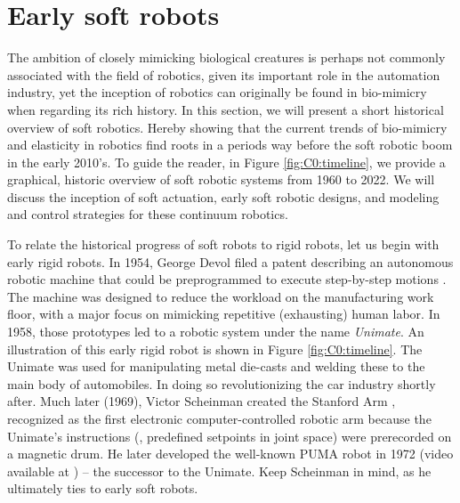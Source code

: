 \section{Early soft robots}

The ambition of closely mimicking biological creatures is perhaps not commonly associated with the field of robotics, given its important role in the automation industry, yet the inception of robotics can originally be found in bio-mimicry when regarding its rich history. In this section, we will present a short historical overview of soft robotics. Hereby showing that the current trends of bio-mimicry and elasticity in robotics find roots in a periods way before the soft robotic boom in the early 2010's. To guide the reader, in Figure \ref{fig:C0:timeline}, we provide a graphical, historic overview of soft robotic systems from 1960 to 2022. We will discuss the inception of soft actuation, early soft robotic designs, and modeling and control strategies for these continuum robotics.

To relate the historical progress of soft robots to rigid robots, let us begin with early rigid robots. In 1954, George Devol filed a patent describing an autonomous robotic machine that could be preprogrammed to execute step-by-step motions \cite{Mickle2008}. The machine was designed to reduce the workload on the manufacturing work floor, with a major focus on mimicking repetitive (exhausting) human labor. In 1958, those prototypes led to a robotic system under the name \emph{Unimate}. An illustration of this early rigid robot is shown in Figure \ref{fig:C0:timeline}. The Unimate was used for manipulating metal die-casts and welding these to the main body of automobiles. In doing so revolutionizing the car industry shortly after. Much later (1969), Victor Scheinman created the Stanford Arm \cite{BibEntryStanford2022Sep,BibEntryOrm2019Sep}, recognized as the first electronic computer-controlled robotic arm because the Unimate's instructions (\ie, predefined setpoints in joint space) were prerecorded on a magnetic drum. He later developed the well-known PUMA robot in 1972 (video available at \cite{BibEntryPuma2022Sep}) -- the successor to the Unimate. Keep Scheinman in mind, as he ultimately ties to early soft robots. \vspace{0.085em}

